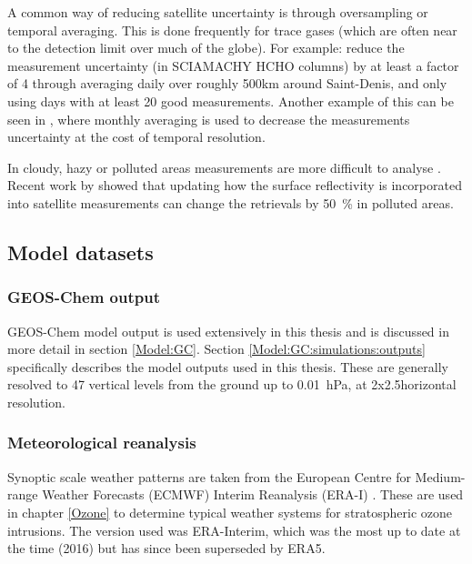       A common way of reducing satellite uncertainty is through oversampling or temporal averaging.
      This is done frequently for trace gases (which are often near to the detection limit over much of the globe).
      For example: \textcite{Vigouroux2009} reduce the measurement uncertainty (in SCIAMACHY HCHO columns) by at least a factor of 4 through averaging daily over roughly 500km around Saint-Denis, and only using days with at least 20 good measurements.
      Another example of this can be seen in \textcite{Dufour2009}, where monthly averaging is used to decrease the measurements uncertainty at the cost of temporal resolution.
      
      In cloudy, hazy or polluted areas measurements are more difficult to analyse \parencite[e.g.,][]{Palmer2003,Marais2014}.
      Recent work by \textcite{Vasilkov2017} showed that updating how the surface reflectivity is incorporated into satellite measurements can change the retrievals by 50~\% in polluted areas.
      
      
  \subsection{Model datasets}
    
    \subsubsection{GEOS-Chem output}
      
      GEOS-Chem model output is used extensively in this thesis and is discussed in more detail in section \ref{Model:GC}.
      Section \ref{Model:GC:simulations:outputs} specifically describes the model outputs used in this thesis.
      These are generally resolved to 47 vertical levels from the ground up to 0.01~hPa, at 2x2.5\degr horizontal resolution.
    
    \subsubsection{Meteorological reanalysis}
      \label{Model:Datasets:ERAI}
      
      Synoptic scale weather patterns are taken from the European Centre for Medium-range Weather Forecasts (ECMWF) Interim Reanalysis (ERA-I) \parencite{Dee2011}.
      These are used in chapter \ref{Ozone} to determine typical weather systems for stratospheric ozone intrusions.
      The version used was ERA-Interim, which was the most up to date at the time (2016) but has since been superseded by ERA5.
    
